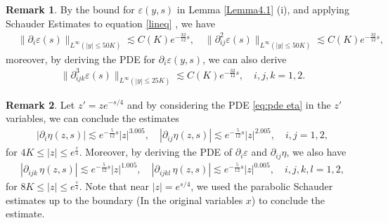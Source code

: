 \documentclass[11pt,reqno]{amsart}
\theoremstyle{definition}
\theoremstyle{bfremark}
\newtheorem{remark}{Remark}[section]
\numberwithin{equation}{section}
\begin{document}
     
     \begin{remark}
     \label{rmk: L2 rho control inner intermd control on boundary}
         By the bound for \(\varepsilon(y,s)\) in Lemma \ref{Lemma4.1} (i), and applying Schauder Estimates to equation \ref{lineq} , we have 
      \begin{align*}
         &\|\partial_i\varepsilon(s)\|_{L^{\infty}(|y| \leq 50K)} \lesssim C(K) e^{-\frac{32}{12}s}, \quad \|\partial^2_{ij}\varepsilon(s)\|_{L^{\infty}(|y| \leq 50K)} \lesssim C(K)e^{-\frac{32}{12}s},
      \end{align*}
      moreover, by deriving the PDE for \(\partial_i \varepsilon(y,s)\), we can also derive
      \begin{align*}
          \|\partial^3_{ijk}\varepsilon(s)\|_{L^{\infty}(|y| \leq 25K)} \lesssim C(K) e^{-\frac{32}{12}s}, \quad i,j,k=1,2.
      \end{align*}
     \end{remark}
     \begin{remark}
     \label{rmk:parabolic z variables}
      Let \(z'=ze^{-s/4}\) and by considering the PDE \ref{eq:pde eta} in the \(z'\) variables, we can conclude the estimates
      \begin{align*}
          |\partial_i \eta(z,s)| \lesssim e^{-\frac{5}{12}s}|z|^{3.005}, \quad |\partial_{ij}\eta(z,s)| \lesssim e^{-\frac{5}{12}s}|z|^{2.005}, \quad i,j=1,2,
      \end{align*}
      for \(4K \leq |z| \leq e^{\frac{s}{4}}\).
      Moreover, by deriving the PDE of \(\partial_i \varepsilon\) and \(\partial_{ij}\eta\), we also have
      \begin{align*}
          |\partial_{ijk}\,\eta(z,s)| \lesssim e^{-\frac{5}{12}s}|z|^{1.005}, \quad |\partial_{ijkl}\,\eta(z,s)| \lesssim e^{-\frac{5}{12}s}|z|^{0.005}, \quad i,j,k,l=1,2,
    \end{align*}
    for \( 8K \leq |z| \leq e^{\frac{s}{4}}\). Note that near \(|z|=e^{s/4}\), we used the parabolic Schauder estimates up to the boundary (In the original variables \(x\)) to conclude the estimate.
    \end{remark}
     
\medskip
\end{document}
